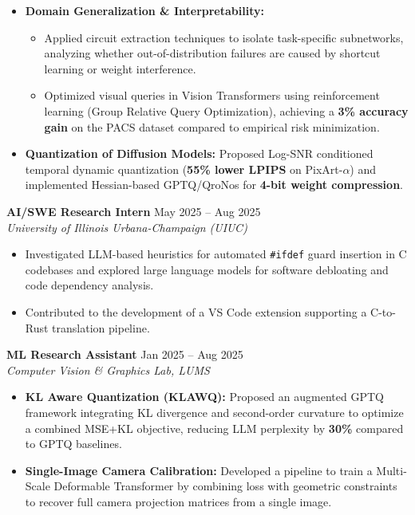 \documentclass[11pt]{article}
\begin{document}
\begin{itemize}
\begin{itemize}[label=$\circ$]
            to prevent representational collapse.
            \item Designed a multi-objective loss function that aligns sparse embeddings with pretrained, fine-tuned, and
            historical snapshot references to maintain feature consistency with pretrained references to prevent representational collapse.
            \item Maintained accuracy comparable to dense baselines at up to \textbf{99\% sparsity}, outperforming standard unstructured pruning approaches across ViTs/CNNs/Language Models.
        \end{itemize}
    \item \textbf{Domain Generalization \& Interpretability:}
            \begin{itemize}[label=$\circ$]
                \item Applied circuit extraction techniques to isolate task-specific subnetworks, analyzing whether out-of-distribution failures are caused by shortcut learning or weight interference.
                \item Optimized visual queries in Vision Transformers using reinforcement learning (Group Relative Query Optimization), achieving a \textbf{3\% accuracy gain} on the PACS dataset compared to empirical risk minimization.
            \end{itemize}
    \item \textbf{Quantization of Diffusion Models:} Proposed Log-SNR conditioned temporal dynamic quantization (\textbf{55\% lower LPIPS} on PixArt-$\alpha$) and implemented Hessian-based GPTQ/QroNos for \textbf{4-bit weight compression}.
\end{itemize}

\textbf{AI/SWE Research Intern} \hfill May 2025 -- Aug 2025\\
\textit{University of Illinois Urbana-Champaign (UIUC)}
\begin{itemize}
    \item Investigated LLM-based heuristics for automated \texttt{\#ifdef} guard insertion in C codebases and explored large language models for software debloating and code dependency analysis.
    \item Contributed to the development of a VS Code extension supporting a C-to-Rust translation pipeline.
\end{itemize}

\textbf{ML Research Assistant} \hfill Jan 2025 -- Aug 2025\\
\textit{Computer Vision \& Graphics Lab, LUMS}
\begin{itemize}
    \item \textbf{KL Aware Quantization (KLAWQ):} Proposed an augmented GPTQ framework integrating KL divergence and second-order curvature to optimize a combined MSE+KL objective, reducing LLM perplexity by \textbf{30\%} compared to GPTQ baselines.
    \item \textbf{Single-Image Camera Calibration:} Developed a pipeline to train a Multi-Scale Deformable Transformer by combining loss with geometric constraints to recover full camera projection matrices from a single image.
\end{itemize}
\end{document}
